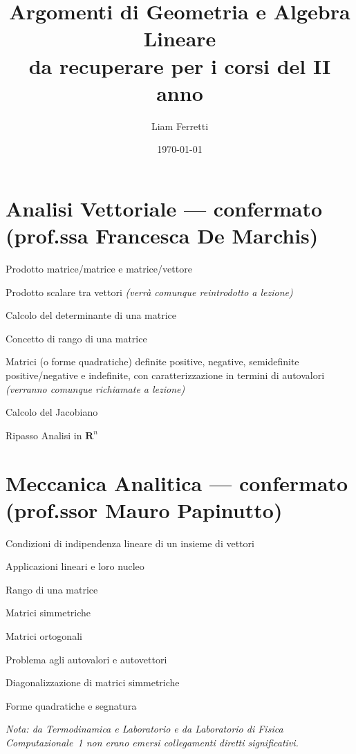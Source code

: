\documentclass[a4paper,11pt]{article}
\title{Argomenti di Geometria e Algebra Lineare\\da recuperare per i corsi del II anno}
\date{\today}
\author{Liam Ferretti}
\begin{document}
\maketitle
\thispagestyle{empty}


\section{Analisi Vettoriale --- confermato (prof.ssa Francesca De Marchis)}
\begin{checklist}
  \item Prodotto matrice/matrice e matrice/vettore
  \item Prodotto scalare tra vettori \textit{(verrà comunque reintrodotto a lezione)}
  \item Calcolo del determinante di una matrice
  \item Concetto di rango di una matrice
  \item Matrici (o forme quadratiche) definite positive, negative, semidefinite
        positive/negative e indefinite, con caratterizzazione in termini di
        autovalori \textit{(verranno comunque richiamate a lezione)}
  \item Calcolo del Jacobiano
  \item Ripasso Analisi in $\mathbf{R}^n$
\end{checklist}

\vspace{0.4cm}

\section{Meccanica Analitica --- confermato (prof.ssor Mauro Papinutto)}
\begin{checklist}
  \item Condizioni di indipendenza lineare di un insieme di vettori
  \item Applicazioni lineari e loro nucleo
  \item Rango di una matrice
  \item Matrici simmetriche
  \item Matrici ortogonali
  \item Problema agli autovalori e autovettori
  \item Diagonalizzazione di matrici simmetriche
  \item Forme quadratiche e segnatura
\end{checklist}

\vspace{0.4cm}
\noindent\textit{Nota: da Termodinamica e Laboratorio e da Laboratorio di Fisica
Computazionale~1 non erano emersi collegamenti diretti significativi.}
\end{document}
